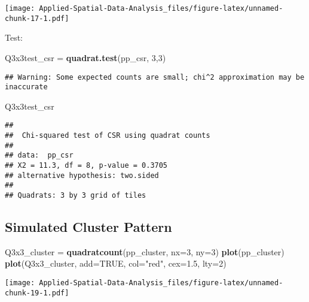 \documentclass[
]{book}
\newenvironment{Shaded}{\begin{snugshade}}{\end{snugshade}}
\newcommand{\DataTypeTok}[1]{\textcolor[rgb]{0.13,0.29,0.53}{#1}}
\newcommand{\DecValTok}[1]{\textcolor[rgb]{0.00,0.00,0.81}{#1}}
\newcommand{\FloatTok}[1]{\textcolor[rgb]{0.00,0.00,0.81}{#1}}
\newcommand{\KeywordTok}[1]{\textcolor[rgb]{0.13,0.29,0.53}{\textbf{#1}}}
\newcommand{\NormalTok}[1]{#1}
\newcommand{\OtherTok}[1]{\textcolor[rgb]{0.56,0.35,0.01}{#1}}
\newcommand{\StringTok}[1]{\textcolor[rgb]{0.31,0.60,0.02}{#1}}
\begin{document}
\texttt{[image: Applied-Spatial-Data-Analysis\_files/figure-latex/unnamed-chunk-17-1.pdf]}

Test:

\begin{Shaded}
\begin{Highlighting}[]
\NormalTok{Q3x3test_csr =}\StringTok{ }\KeywordTok{quadrat.test}\NormalTok{(pp_csr, }\DecValTok{3}\NormalTok{,}\DecValTok{3}\NormalTok{)}
\end{Highlighting}
\end{Shaded}

\begin{verbatim}
## Warning: Some expected counts are small; chi^2 approximation may be inaccurate
\end{verbatim}

\begin{Shaded}
\begin{Highlighting}[]
\NormalTok{Q3x3test_csr}
\end{Highlighting}
\end{Shaded}

\begin{verbatim}
## 
## 	Chi-squared test of CSR using quadrat counts
## 
## data:  pp_csr
## X2 = 11.3, df = 8, p-value = 0.3705
## alternative hypothesis: two.sided
## 
## Quadrats: 3 by 3 grid of tiles
\end{verbatim}

\hypertarget{simulated-cluster-pattern}{%
\subsection{Simulated Cluster Pattern}\label{simulated-cluster-pattern}}

\begin{Shaded}
\begin{Highlighting}[]
\NormalTok{Q3x3_cluster =}\StringTok{ }\KeywordTok{quadratcount}\NormalTok{(pp_cluster, }\DataTypeTok{nx=}\DecValTok{3}\NormalTok{, }\DataTypeTok{ny=}\DecValTok{3}\NormalTok{)}
\KeywordTok{plot}\NormalTok{(pp_cluster)}
\KeywordTok{plot}\NormalTok{(Q3x3_cluster, }\DataTypeTok{add=}\OtherTok{TRUE}\NormalTok{, }\DataTypeTok{col=}\StringTok{"red"}\NormalTok{, }\DataTypeTok{cex=}\FloatTok{1.5}\NormalTok{, }\DataTypeTok{lty=}\DecValTok{2}\NormalTok{)}
\end{Highlighting}
\end{Shaded}

\texttt{[image: Applied-Spatial-Data-Analysis\_files/figure-latex/unnamed-chunk-19-1.pdf]}
\end{document}

